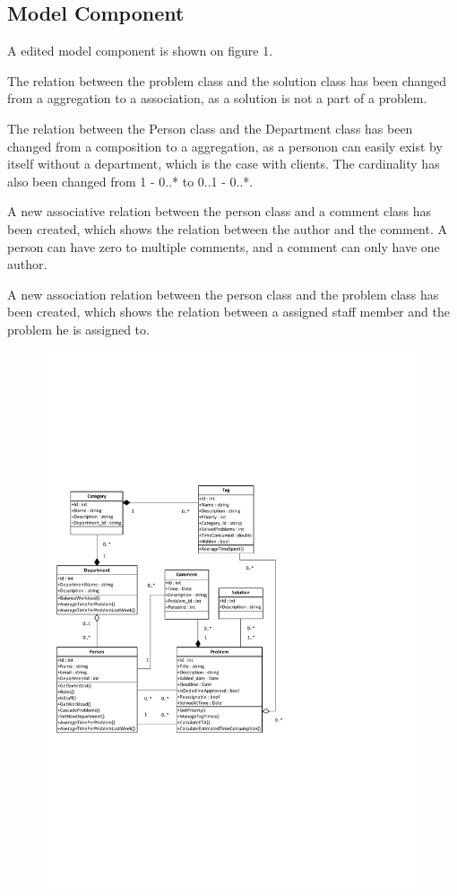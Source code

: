 \subsection*{Model Component}
A edited model component is shown on figure 1.

The relation between the problem class and the solution class has been changed from a aggregation to a association, as a solution is not a part of a problem.

The relation between the Person class and the Department class has been changed from a composition to a aggregation, as a personon can easily exist by itself without a department, which is the case with clients. The cardinality has also been changed from 1 - 0..* to 0..1 - 0..*.

A new associative relation between the person class and a comment class has been created, which shows the relation between the author and the comment. A person can have zero to multiple comments, and a comment can only have one author.

A new association relation between the person class and the problem class has been created, which shows the relation between a assigned staff member and the problem he is assigned to.	

\begin{figure}[p]%
\includegraphics[clip=true, height=1.0\textwidth, trim=0.5cm 5cm 7.5cm 7cm]{ClassDiagramV3.pdf}%
\label{mod}
\end{figure}

